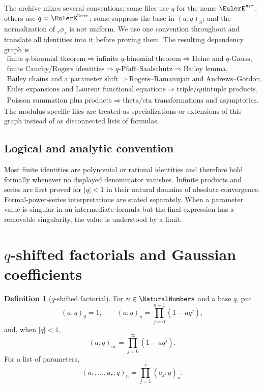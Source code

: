 \documentclass[11pt]{article}
\numberwithin{equation}{section}
\theoremstyle{definition}
\newtheorem{definition}[theorem]{Definition}
\theoremstyle{remark}
\begin{document}
The archive mixes several conventions: some files use $q$ for the nome
$\EulerE^{\pi i\tau}$, others use $q=\EulerE^{2\pi i\tau}$; some suppress the base in
$(a;q)_n$; and the normalization of ${}_r\phi_s$ is not uniform.  We use one
convention throughout and translate all identities into it before proving
them.  The resulting dependency graph is
\[
\begin{gathered}
\text{finite $q$-binomial theorem}
 \Longrightarrow \text{infinite $q$-binomial theorem}
 \Longrightarrow \text{Heine and $q$-Gauss},\\
\text{finite Cauchy/Rogers identities}
 \Longrightarrow q\text{-Pfaff--Saalsch\"utz}
 \Longrightarrow \text{Bailey lemma},\\
\text{Bailey chains and a parameter shift}
 \Longrightarrow \text{Rogers--Ramanujan and Andrews--Gordon},\\
\text{Euler expansions and Laurent functional equations}
 \Longrightarrow \text{triple/quintuple products},\\
\text{Poisson summation plus products}
 \Longrightarrow \text{theta/eta transformations and asymptotics}.
\end{gathered}
\]
The modulus-specific files are treated as specializations or extensions of
this graph instead of as disconnected lists of formulas.

\subsection*{Logical and analytic convention}
Most finite identities are polynomial or rational identities and therefore
hold formally whenever no displayed denominator vanishes.  Infinite products
and series are first proved for $|q|<1$ in their natural domains of absolute
convergence.  Formal-power-series interpretations are stated separately.
When a parameter value is singular in an intermediate formula but the final
expression has a removable singularity, the value is understood by a limit.

\section{$q$-shifted factorials and Gaussian coefficients}

\begin{definition}[$q$-shifted factorial]
For $n\in\NaturalNumbers$ and a base $q$, put
\[
(a;q)_0=1,\qquad (a;q)_n=\prod_{j=0}^{n-1}(1-aq^j),
\]
and, when $|q|<1$,
\[
(a;q)_\infty=\prod_{j=0}^{\infty}(1-aq^j).
\]
For a list of parameters,
\[
(a_1,\ldots,a_r;q)_n=\prod_{j=1}^r(a_j;q)_n.
\]
\end{definition}
\end{document}
